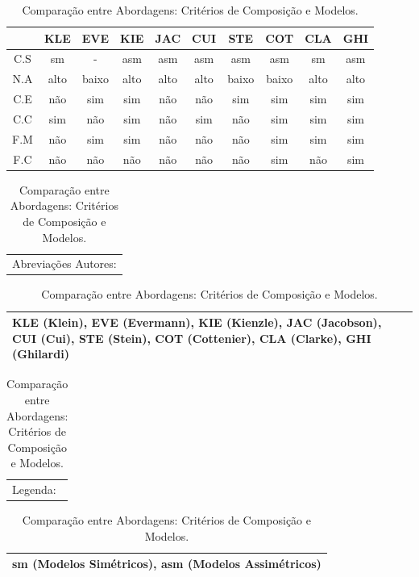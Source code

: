\begin{table}[h]
	\centering
	\begin{tabular}{ | c | c | c | c | c | c | c | c | c | c | }
		\hline
		 & KLE & EVE & KIE & JAC & CUI & STE & COT & CLA & GHI \\
		\hline
		 C.S & sm & - & asm & asm & asm & asm & asm & sm & asm \\
		\hline
		 N.A & alto & baixo & alto & alto & alto & baixo & baixo & alto & alto \\
		\hline
		 C.E & não & sim & sim & não & não & sim & sim & sim & sim \\
		\hline
		 C.C & sim & não & sim & não & sim & não & sim & sim & sim \\
		\hline
		 F.M & não & sim & sim & não & não & não & sim & sim & sim \\
		\hline
		 F.C & não & não & não & não & não & não & sim & não & sim  \\
		\hline
	\end{tabular}
	
	\hspace{2em}

	\begin{tabular}{  p{12cm}  }
		Abreviações Autores: \\
	\end{tabular}
	
	\begin{tabular}{ | p{12cm} | }
		\hline
		KLE (Klein), EVE (Evermann), KIE (Kienzle), JAC (Jacobson), CUI (Cui), STE (Stein), COT (Cottenier), CLA (Clarke), GHI (Ghilardi) \\
		\hline
	\end{tabular}

	\begin{tabular}{  p{12cm}  }
		Legenda: \\
	\end{tabular}

	\begin{tabular}{ | p{12cm} | }
		\hline
		sm (Modelos Simétricos), asm (Modelos Assimétricos) \\
		\hline
	\end{tabular}
	\caption{Comparação entre Abordagens: Critérios de Composição e Modelos.}
	\label{tab:comparison_table_models}
\end{table} 


